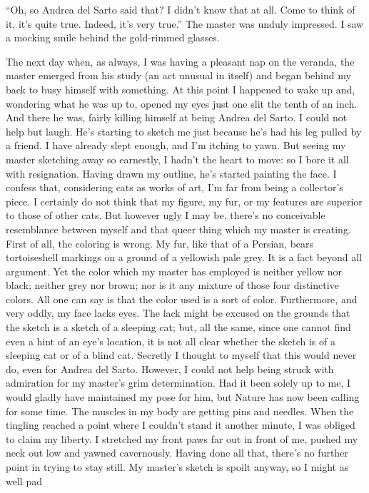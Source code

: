 \documentclass[12pt, openright]{book}
\begin{document}
``Oh, so Andrea del Sarto said that? I didn't know that at all. Come to
think of it, it's quite true. Indeed, it's very true.'' The master was
unduly impressed. I saw a mocking smile behind the gold-rimmed glasses.

The next day when, as always, I was having a pleasant nap on the
veranda, the master emerged from his study (an act unusual in itself)
and began behind my back to busy himself with something. At this point I
happened to wake up and, wondering what he was up to, opened my eyes
just one slit the tenth of an inch. And there he was, fairly killing
himself at being Andrea del Sarto. I could not help but laugh. He's
starting to sketch me just because he's had his leg pulled by a friend.
I have already slept enough, and I'm itching to yawn. But seeing my
master sketching away so earnestly, I hadn't the heart to move: so I
bore it all with resignation. Having drawn my outline, he's started
painting the face. I confess that, considering cats as works of art, I'm
far from being a collector's piece. I certainly do not think that my
figure, my fur, or my features are superior to those of other cats. But
however ugly I may be, there's no conceivable resemblance between myself
and that queer thing which my master is creating. First of all, the
coloring is wrong. My fur, like that of a Persian, bears tortoiseshell
markings on a ground of a yellowish pale grey. It is a fact beyond all
argument. Yet the color which my master has employed is neither yellow
nor black; neither grey nor brown; nor is it any mixture of those four
distinctive colors. All one can say is that the color used is a sort of
color. Furthermore, and very oddly, my face lacks eyes. The lack might
be excused on the grounds that the sketch is a sketch of a sleeping cat;
but, all the same, since one cannot find even a hint of an eye's
location, it is not all clear whether the sketch is of a sleeping cat or
of a blind cat. Secretly I thought to myself that this would never do,
even for Andrea del Sarto. However, I could not help being struck with
admiration for my master's grim determination. Had it been solely up to
me, I would gladly have maintained my pose for him, but Nature has now
been calling for some time. The muscles in my body are getting pins and
needles. When the tingling reached a point where I couldn't stand it
another minute, I was obliged to claim my liberty. I stretched my front
paws far out in front of me, pushed my neck out low and yawned
cavernously. Having done all that, there's no further point in trying to
stay still. My master's sketch is spoilt anyway, so I might as well pad
\end{document}
